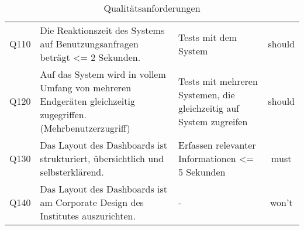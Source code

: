 \begin{table}[H]
\begin{adjustbox}{max width=\textwidth}
\begin{tabular}{lp{8cm}p{5cm}c}
        Q110                              &Die Reaktionszeit des Systems auf Benutzungsanfragen beträgt <= 2 Sekunden. & Tests mit dem System& should\\
        Q120                              &Auf das System wird in vollem Umfang von mehreren Endgeräten gleichzeitig zugegriffen. (Mehrbenutzerzugriff) & Tests mit mehreren Systemen, die gleichzeitig auf System zugreifen& should\\
        Q130                              &Das Layout des Dashboards ist strukturiert, übersichtlich und selbsterklärend. & Erfassen relevanter Informationen <= 5 Sekunden& must\\
        Q140                              &Das Layout des Dashboards ist am Corporate Design des Institutes auszurichten. & -& won't\\
       \bottomrule
    \end{tabular}
    \end{adjustbox}
    \caption{%
        Qualitätsanforderungen
    }
    \label{tab:Qualitätsanforderungen}
    \end{table}
\endgroup
